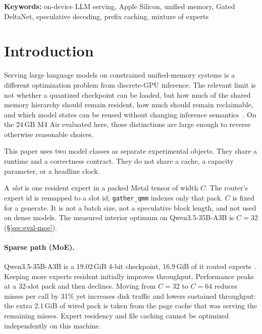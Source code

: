 \begin{abstract}
These results show that constrained unified-memory serving is not only a model-size problem. Accelerator residency, file caching, hybrid-state correctness, and prompt reuse interact strongly enough that optimizing any one of them in isolation can make the system slower or change the model being served. The study is limited to a single 24\,GB Apple Silicon platform; its contribution is the resulting systems design and the measured behavior of that design, rather than a claim of platform-independent speedup.
\end{abstract}

\vspace{0.4em}
\noindent\textbf{Keywords:} on-device LLM serving, Apple Silicon, unified memory, Gated DeltaNet, speculative decoding, prefix caching, mixture of experts

\section{Introduction}
\label{sec:intro}

Serving large language models on constrained unified-memory systems is a different optimization problem from discrete-GPU inference. The relevant limit is not whether a quantized checkpoint can be loaded, but how much of the shared memory hierarchy should remain resident, how much should remain reclaimable, and which model states can be reused without changing inference semantics~\citep{appleum,kwon2023vllm}. On the 24\,GB M4 Air evaluated here, those distinctions are large enough to reverse otherwise reasonable choices.

This paper uses two model classes as separate experimental objects. They share a runtime and a correctness contract. They do not share a cache, a capacity parameter, or a headline clock.

\begin{definition}
A \emph{slot} is one resident expert in a packed Metal tensor of width $C$. The router’s expert id is remapped to a slot id; \texttt{gather\_qmm} indexes only that pack. $C$ is fixed for a generate. It is not a batch size, not a speculative block length, and not used on dense models. The measured interior optimum on Qwen3.5-35B-A3B is $C{=}32$ (\S\ref{sec:eval-moe}).
\end{definition}

\paragraph{Sparse path (MoE).}
Qwen3.5-35B-A3B is a 19.02\,GiB 4-bit checkpoint, 16.9\,GiB of it routed experts~\citep{qwen35a3b,shazeer2017moe}. Keeping more experts resident initially improves throughput. Performance peaks at a 32-slot pack and then declines. Moving from $C{=}32$ to $C{=}64$ reduces misses per call by 31\% yet increases disk traffic and lowers sustained throughput: the extra 2.1\,GiB of wired pack is taken from the page cache that was serving the remaining misses. Expert residency and file caching cannot be optimized independently on this machine.

